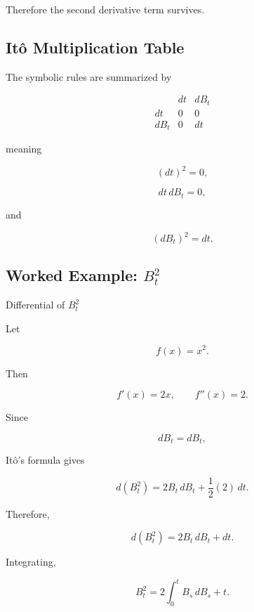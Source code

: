 Therefore the second derivative term survives.

\subsection{It\^o Multiplication Table}
\label{subsec:ito-multiplication-table}

The symbolic rules are summarized by

\[
\begin{array}{c|cc}
 & dt & dB_t\\
\hline
dt & 0 & 0\\
dB_t & 0 & dt
\end{array}
\]

meaning

\[
\boxed{
(dt)^2=0,
}
\]

\[
\boxed{
dt\,dB_t=0,
}
\]

and

\[
\boxed{
(dB_t)^2=dt.
}
\]

\subsection{Worked Example: \(B_t^2\)}
\label{subsec:worked-ito-brownian-square}

\begin{workedexamplebox}{Differential of \(B_t^2\)}

Let

\[
f(x)=x^2.
\]

Then

\[
f'(x)=2x,
\qquad
f''(x)=2.
\]

Since

\[
dB_t=dB_t,
\]

It\^o's formula gives

\[
d(B_t^2)
=
2B_t\,dB_t
+
\frac12(2)\,dt.
\]

Therefore,

\begin{answerbox}
\[
\boxed{
d(B_t^2)
=
2B_t\,dB_t
+
dt.
}
\]
\end{answerbox}

Integrating,

\[
\boxed{
B_t^2
=
2\int_0^t
B_s\,dB_s
+
t.
}
\]

\end{workedexamplebox}

